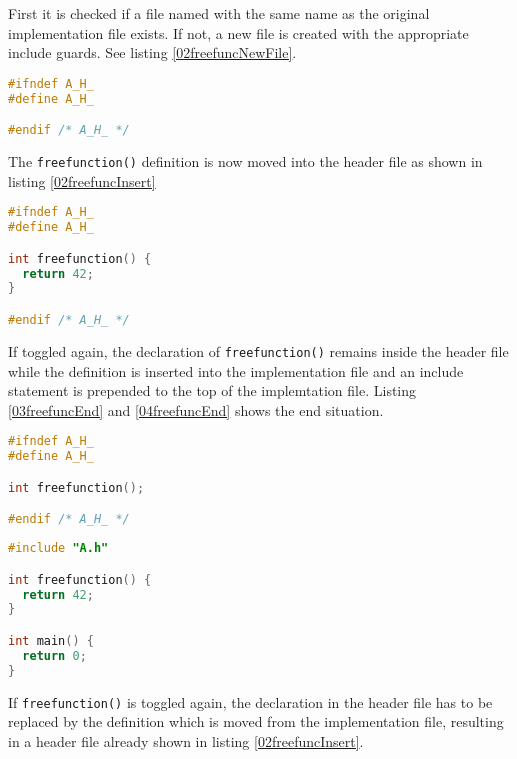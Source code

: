 First it is checked if a file named with the same name as the original
implementation file exists. If not, a new file is created with the
appropriate include guards. See listing \nolinebreak\ref{02freefuncNewFile}.

\begin{lstlisting}[caption={Newly created A.h}, label={02freefuncNewFile},
language=C++]
#ifndef A_H_
#define A_H_

#endif /* A_H_ */
\end{lstlisting}

The \texttt{freefunction()} definition is now moved into the header
file as shown in listing \nolinebreak\ref{02freefuncInsert}

\begin{lstlisting}[caption={Inserted \texttt{freefunction()} in A.h},
label={02freefuncInsert}, language=C++]
#ifndef A_H_
#define A_H_

int freefunction() {
  return 42;
}

#endif /* A_H_ */
\end{lstlisting}

If toggled again, the declaration of \texttt{freefunction()} remains inside the
header file while the definition is inserted into the implementation file and an
include statement is prepended to the top of the implemtation file. Listing
\nolinebreak\ref{03freefuncEnd} and \ref{04freefuncEnd} shows the end
situation.

\vspace{0.5cm}
\begin{minipage}{.48\textwidth}
\lstset{xrightmargin=0.5cm}
\begin{lstlisting}[caption={Inserted freefunction in A.h},
label={03freefuncEnd}, language=C++]
#ifndef A_H_
#define A_H_

int freefunction();

#endif /* A_H_ */
\end{lstlisting}
\end{minipage}%
\begin{minipage}{.48\textwidth}
\lstset{xleftmargin=0.5cm}
\begin{lstlisting}[caption={A.cpp},label={04freefuncEnd},language=C++]
#include "A.h"

int freefunction() {
  return 42;
}

int main() {
  return 0;
}
\end{lstlisting}
\end{minipage}

If \texttt{freefunction()} is toggled again, the declaration in the header file
has to be replaced by the definition which is moved from the implementation
file, resulting in a header file already shown in listing
\nolinebreak\ref{02freefuncInsert}.

